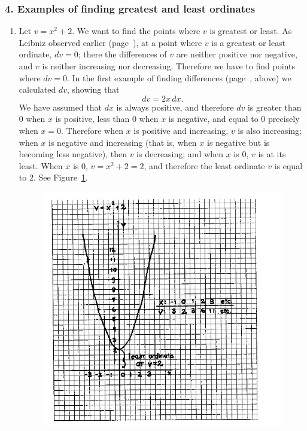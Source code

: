 \documentclass[twoside,openright]{article}
\begin{document}
\subsubsection*{4. Examples of finding greatest and least ordinates}
\begin{enumerate}
\item Let $v = x^2 + 2.$ We want to find the points where $v$ is
  greatest or least.  As Leibniz observed earlier
  (page~\pageref{dvzero}), at a point where $v$ is a greatest or least
  ordinate, $dv=0$; there the differences of $v$ are neither positive
  nor negative, and $v$ is neither increasing nor decreasing.
  Therefore we have to find points where $dv =0$.  In the first
  example of finding differences (page~\pageref{ex1}, above) we
  calculated $dv$, showing that
$$dv = 2x\,dx.$$
We have assumed that $dx$ is always positive, and therefore $dv$ is
greater than 0 when $x$ is positive, less than 0 when $x$ is negative,
and equal to 0 precisely when $x =0$.  Therefore when $x$ is positive
and increasing, $v$ is also increasing; when $x$ is negative and
increasing (that is, when $x$ is negative but is becoming less
negative), then $v$ is decreasing; and when $x$ is 0, $v$ is at its
least.  When $x$ is 0, $v = x^2 + 2 =2$, and therefore the least
ordinate $v$ is equal to 2. See Figure~\ref{glex1}.
\begin{figure}[htp]
\begin{center}
\includegraphics[width=\textwidth]{fig/Figure14}
\caption{}
\label{glex1}
\vspace{-10pt}
\end{center}
\end{figure}


\end{enumerate}
\end{document}

